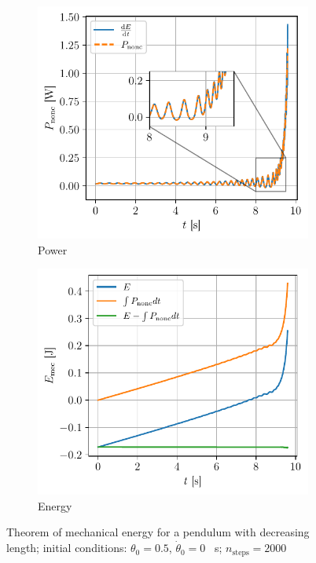 \begin{figure}[H]
    \centering
    \begin{subfigure}{0.48\linewidth}
        \centering
        \includegraphics[width=\linewidth]{figures/retract_power.pdf}
        \caption{Power}
        \label{fig:retract_power}
    \end{subfigure}
    \begin{subfigure}{0.48\linewidth}
        \centering
        \includegraphics[width=\linewidth]{figures/retract_energy.pdf}
        \caption{Energy}
        \label{fig:retract_energy}
    \end{subfigure}
    \caption{Theorem of mechanical energy for a pendulum with decreasing length; initial conditions: $\theta_0 = 0.5$, $\dot{\theta}_0 = 0$ \si{\per\second}; $n_\textrm{steps}=2000$}
\end{figure}


